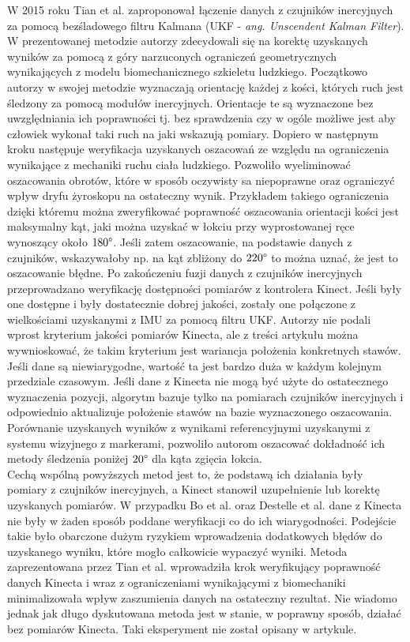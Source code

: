 W 2015 roku Tian et al. \cite{Tian2015a} zaproponował łączenie danych z czujników inercyjnych za pomocą bezśladowego filtru Kalmana (UKF - \emph{ang. Unscendent Kalman Filter}). W prezentowanej metodzie autorzy zdecydowali się na korektę uzyskanych wyników za pomocą z góry narzuconych ograniczeń geometrycznych wynikających z modelu biomechanicznego szkieletu ludzkiego. Początkowo autorzy w swojej metodzie wyznaczają orientację każdej z kości, których ruch jest śledzony za pomocą modułów inercyjnych. Orientacje te są wyznaczone bez uwzględniania ich poprawności tj. bez sprawdzenia czy w ogóle możliwe jest aby człowiek wykonał taki ruch na jaki wskazują pomiary. Dopiero w następnym kroku następuje weryfikacja uzyskanych oszacowań ze względu na ograniczenia wynikające z mechaniki ruchu ciała ludzkiego. Pozwoliło wyeliminować oszacowania obrotów, które w sposób oczywisty sa niepoprawne oraz ograniczyć wpływ dryfu żyroskopu na ostateczny wynik. Przykładem takiego ograniczenia dzięki któremu można zweryfikować poprawność oszacowania orientacji kości jest maksymalny kąt, jaki można uzyskać w łokciu przy wyprostowanej ręce wynoszący około $180\degree$. Jeśli zatem oszacowanie, na podstawie danych z czujników, wskazywałoby np. na kąt zbliżony do $220\degree$ to można uznać, że jest to oszacowanie błędne. Po zakończeniu fuzji danych z czujników inercyjnych przeprowadzano weryfikację dostępności pomiarów z kontrolera Kinect. Jeśli były one dostępne i były dostatecznie dobrej jakości, zostały one połączone z wielkościami uzyskanymi z IMU za pomocą filtru UKF. Autorzy nie podali wprost kryterium jakości pomiarów Kinecta, ale z treści artykułu można wywnioskować, że takim kryterium jest wariancja położenia konkretnych stawów. Jeśli dane są niewiarygodne, wartość ta jest bardzo duża w każdym kolejnym przedziale czasowym. Jeśli dane z Kinecta nie mogą być użyte do ostatecznego wyznaczenia pozycji, algorytm bazuje tylko na pomiarach czujników inercyjnych i odpowiednio aktualizuje położenie stawów na bazie wyznaczonego oszacowania. Porównanie uzyskanych wyników z wynikami referencyjnymi uzyskanymi z systemu wizyjnego z markerami, pozwoliło autorom oszacować dokładność ich metody śledzenia poniżej $20\degree$ dla kąta zgięcia łokcia.\\
		
Cechą wspólną powyższych metod jest to, że podstawą ich działania były pomiary z czujników inercyjnych, a Kinect stanowił uzupełnienie lub korektę uzyskanych pomiarów. W przypadku Bo et al. oraz Destelle et al. dane z Kinecta nie były w żaden sposób poddane weryfikacji co do ich wiarygodności. Podejście takie było obarczone dużym ryzykiem wprowadzenia dodatkowych błędów do uzyskanego wyniku, które mogło całkowicie wypaczyć wyniki. Metoda zaprezentowana przez Tian et al. wprowadziła krok weryfikujący poprawność danych Kinecta i wraz z ograniczeniami wynikającymi z biomechaniki minimalizowała wpływ zaszumienia danych na ostateczny rezultat. Nie wiadomo jednak jak długo dyskutowana metoda jest w stanie, w poprawny sposób, działać bez pomiarów Kinecta. Taki eksperyment nie został opisany w artykule.\\\\
		
